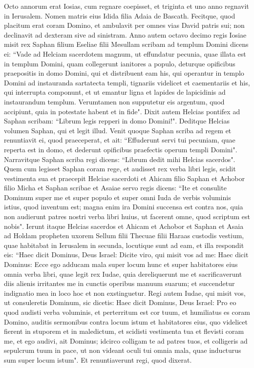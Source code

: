 \begin{biblechapter}  
\verse Octo annorum erat Iosias, cum regnare coepisset, et triginta et uno anno regnavit in Ierusalem. Nomen matris eius Idida filia Adaia de Bascath. 
\verse Fecitque, quod placitum erat coram Domino, et ambulavit per omnes vias David patris sui; non declinavit ad dexteram sive ad sinistram. 
\verse Anno autem octavo decimo regis Iosiae misit rex Saphan filium Eseliae filii Mesullam scribam ad templum Domini dicens ei: 
\verse “Vade ad Helciam sacerdotem magnum, ut effundatur pecunia, quae illata est in templum Domini, quam collegerunt ianitores a populo, 
\verse deturque opificibus praepositis in domo Domini, qui et distribuent eam his, qui operantur in templo Domini ad instauranda sartatecta templi, 
\verse tignariis videlicet et caementariis et his, qui interrupta componunt, et ut emantur ligna et lapides de lapicidinis ad instaurandum templum. 
\verse Verumtamen non supputetur eis argentum, quod accipiunt, quia in potestate habent et in fide". 
\verse Dixit autem Helcias pontifex ad Saphan scribam: “Librum legis repperi in domo Domini!". Deditque Helcias volumen Saphan, qui et legit illud. 
\verse Venit quoque Saphan scriba ad regem et renuntiavit ei, quod praeceperat, et ait: “Effuderunt servi tui pecuniam, quae reperta est in domo, et dederunt opificibus praefectis operum templi Domini". 
\verse Narravitque Saphan scriba regi dicens: “Librum dedit mihi Helcias sacerdos". Quem cum legisset Saphan coram rege, 
\verse et audisset rex verba libri legis, scidit vestimenta sua 
\verse et praecepit Helciae sacerdoti et Ahicam filio Saphan et Achobor filio Micha et Saphan scribae et Asaiae servo regis dicens:  
\verse “Ite et consulite Dominum super me et super populo et super omni Iuda de verbis voluminis istius, quod inventum est; magna enim ira Domini succensa est contra nos, quia non audierunt patres nostri verba libri huius, ut facerent omne, quod scriptum est nobis". 
\verse Ierunt itaque Helcias sacerdos et Ahicam et Achobor et Saphan et Asaia ad Holdam propheten uxorem Sellum filii Thecuae filii Haraas custodis vestium, quae habitabat in Ierusalem in secunda, locutique sunt ad eam, 
\verse et illa respondit eis: “Haec dicit Dominus, Deus Israel: Dicite viro, qui misit vos ad me: 
\verse Haec dicit Dominus: Ecce ego adducam mala super locum hunc et super habitatores eius omnia verba libri, quae legit rex Iudae, 
\verse quia dereliquerunt me et sacrificaverunt diis alienis irritantes me in cunctis operibus manuum suarum; et succendetur indignatio mea in loco hoc et non exstinguetur. 
\verse Regi autem Iudae, qui misit vos, ut consuleretis Dominum, sic dicetis: Haec dicit Dominus, Deus Israel: Pro eo quod audisti verba voluminis, 
\verse et perterritum est cor tuum, et humiliatus es coram Domino, auditis sermonibus contra locum istum et habitatores eius, quo videlicet fierent in stuporem et in maledictum, et scidisti vestimenta tua et flevisti coram me, et ego audivi, ait Dominus; 
\verse idcirco colligam te ad patres tuos, et colligeris ad sepulcrum tuum in pace, ut non videant oculi tui omnia mala, quae inducturus sum super locum istum". Et renuntiaverunt regi, quod dixerat. 
\end{biblechapter}

